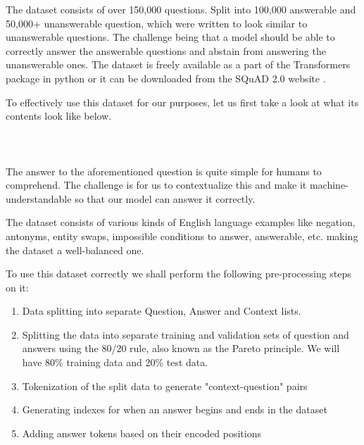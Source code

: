 \documentclass[11pt]{article}
\begin{document}
	The dataset consists of over 150,000 questions. Split into 100,000 answerable and 50,000+ unanswerable question, which were written to look similar to unanswerable questions. The challenge being that a model should be able to correctly answer the answerable questions and abstain from answering the unanswerable ones.
	The dataset is freely available as a part of the Transformers package in python or it can be downloaded from the SQuAD 2.0 website \citep{squad}.

	To effectively use this dataset for our purposes, let us first take a look at what its contents look like below.\\ \\
	\noindent{}
	\\ \\

	The answer to the aforementioned question is quite simple for humans to comprehend. The challenge is for us to contextualize this and make it machine-understandable so that our model can answer it correctly.

	The dataset consists of various kinds of English language examples like negation, antonyms, entity swaps, impossible conditions to answer, answerable, etc. making the dataset a well-balanced one.

	To use this dataset correctly we shall perform the following pre-processing steps on it:

	\begin{enumerate}
		\item Data splitting into separate Question, Answer and Context lists.
		\item Splitting the data into separate training and validation sets of  question and answers using the 80/20 rule, also known as the Pareto principle. We will have 80\% training data and 20\% test data.
		\item Tokenization of the split data to generate "context-question" pairs
		\item Generating indexes for when an answer begins and ends in the dataset
		\item Adding answer tokens based on their encoded positions
	\end{enumerate}
\end{document}
